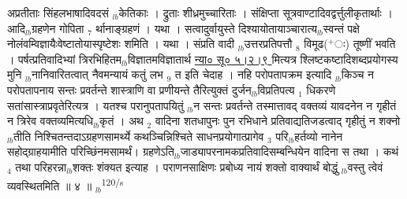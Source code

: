 \documentclass[article,12pt,a4paper]{memoir}%
\newcommand{\add}[1]{($^{+}$#1)}
\newcounter{parCount}
\begin{document}
अप्रतीताः सिंहलभाषादिवदसं {\tiny $_{lb}$}केतिकाः । द्रुताः शीध्रमुच्चारिताः । संक्षिप्ता सूत्रवाण्टादिवद्वर्त्तुलीकृतार्थाः । आदि{\tiny $_{lb}$}ग्रहणेन गोपिता {\tiny $_{7}$} र्थानाङ्ग्रहणं । यथा । सत्वादुर्वायुस्ते दिश्यायोतायाञ्चारात्य{\tiny $_{lb}$}स्वन्तं पक्षे नोलंवम्विज्ञायैःवेष्टातोयास्पृष्टेशः शमिति । यथा । संप्रति वादी {\tiny $_{lb}$}उत्तरप्रतिपत्तौ {\tiny $_{8}$} विमूढ\add{ः} तूष्णीं भवति । पर्षत्प्रतिवादिभ्यां त्रिरभिहितम{\tiny $_{lb}$}विज्ञातमविज्ञातार्थ \href{http://sarit.indology.info/?cref=ns\%C5\%AB.5.2.9}{न्या० सू० ५।२।९ } मित्यत्र श्लिष्टकष्टादिशब्दप्रयोगस्य {\color{DodgerBlue3}मुनि} {\tiny $_{lb}$}नानिवारितत्वात् नैवमन्यायं कतुं लभ {\tiny $_{9}$} \leavevmode{} त इति चेदाह । {\color{DodgerBlue3}नहि परोपतापक्रम इत्यादि} {\tiny $_{lb}$}किञ्च न परोपतापनाय सन्तः प्रवर्तन्ते शास्त्राणि वा प्रणीयन्ते तैरित्युक्तं दुर्जन{\tiny $_{lb}$}विप्रतिपत्य {\tiny $_{1}$} धिकरणे सतांसास्त्राप्रवृतेरित्यत्र । यतश्च परानुपतापयितुं {\tiny $_{lb}$}न सन्तः प्रवर्तन्ते तस्मात्तावद् वक्तव्यं यावदनेन न गृहीतं न त्रिरेव वक्तव्यमित्यधि{\tiny $_{lb}$}कृतं । अथ {\tiny $_{2}$} वादिना शतधापुनः पुन रभिधाने प्रतिवाद्यतिजडत्वाद् गृहीतुं न शक्नो{\tiny $_{lb}$}तीति निश्चितन्तदाऽग्रहणसामर्थ्ये कथञ्चिन्निश्चिते साधनप्रयोगात्प्रागेव {\tiny $_{3}$} परि{\tiny $_{lb}$}हर्तव्यो नानेन सहोद्ग्राहयामीति परिच्छिंनमसामर्थं। ग्रहणेऽति{\tiny $_{lb}$}जाड्यापरनामकप्रतिवादिसम्बन्धियेन वादिना स तथा । कथं {\tiny $_{4}$} तथा परिहरन्ना{\tiny $_{lb}$}शक्तः शंक्यत इत्याह । पराणनसाक्षिणः प्रबोध्य नायं शक्तो वाक्यार्थं बोद्धुं {\tiny $_{lb}$}वस्तु त्वेवं व्यवस्थितमिति ॥ ४ ॥
	{}
	\pend%
      {\tiny $_{lb}$}\textsuperscript{\textenglish{120/s}}
\end{document}
